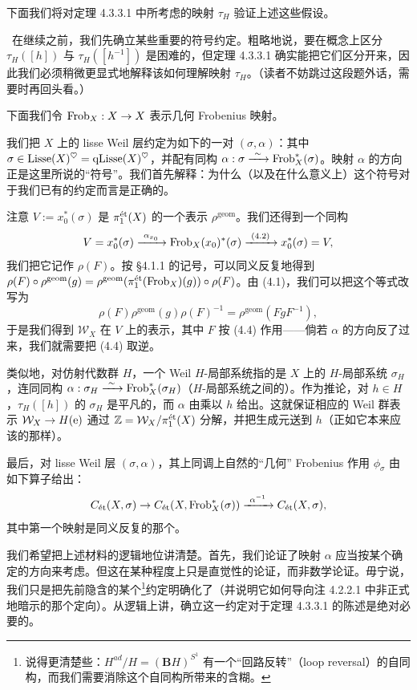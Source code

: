 下面我们将对定理 4.3.3.1 中所考虑的映射 $\tau_H$ 验证上述这些假设。

\ 在继续之前，我们先确立某些重要的符号约定。粗略地说，要在概念上区分 $\tau_H([h])$ 与 $\tau_H([h^{-1}])$ 是困难的，但定理 4.3.3.1 确实能把它们区分开来，因此我们必须稍微更显式地解释该如何理解映射 $\tau_H$。（读者不妨跳过这段题外话，需要时再回头看。）

下面我们令 $\Frob_X : X \to X$ 表示几何 Frobenius 映射。

我们把 $X$ 上的 lisse Weil 层约定为如下的一对 $(\sigma,\alpha)$：其中 $\sigma \in \mathrm{Lisse}(X)^\heartsuit = \qLisse(X)^\heartsuit$，并配有同构 $\alpha : \sigma \xrightarrow{\ \sim\ } \Frob_X^*(\sigma)$。映射 $\alpha$ 的方向正是这里所说的“符号”。我们首先解释：为什么（以及在什么意义上）这个符号对于我们已有的约定而言是正确的。

注意 $V := x_0^*(\sigma)$ 是 $\pi_1^{\et}(X)$ 的一个表示 $\rho^{\mathrm{geom}}$。我们还得到一个同构
\begin{equation}
  V = x_0^*(\sigma) \xrightarrow{\ \alpha_{x_0}\ } \Frob_X(x_0)^*(\sigma) \xrightarrow{\ (4.2)\ } x_0^*(\sigma) = V,
\end{equation}
我们把它记作 $\rho(F)$。按 §4.1.1 的记号，可以同义反复地得到 $\rho(F) \circ \rho^{\mathrm{geom}}(g) = \rho^{\mathrm{geom}}(\pi_1^{\et}(\Frob_X)(g)) \circ \rho(F)$。由 (4.1)，我们可以把这个等式改写为
\[
  \rho(F)\rho^{\mathrm{geom}}(g)\rho(F)^{-1} = \rho^{\mathrm{geom}}(FgF^{-1}),
\]
于是我们得到 $\mathcal{W}_X$ 在 $V$ 上的表示，其中 $F$ 按 (4.4) 作用——倘若 $\alpha$ 的方向反了过来，我们就需要把 (4.4) 取逆。

类似地，对仿射代数群 $H$，一个 Weil $H$-局部系统指的是 $X$ 上的 $H$-局部系统 $\sigma_H$，连同同构 $\alpha : \sigma_H \xrightarrow{\ \sim\ } \Frob_X^*(\sigma_H)$（$H$-局部系统之间的）。作为推论，对 $h \in H$，$\tau_H([h])$ 的 $\sigma_H$ 是平凡的，而 $\alpha$ 由乘以 $h$ 给出。这就保证相应的 Weil 群表示 $\mathcal{W}_X \to H(\e)$ 通过 $\ZZ = \mathcal{W}_X/\pi_1^{\et}(X)$ 分解，并把生成元送到 $h$（正如它本来应该的那样）。

最后，对 lisse Weil 层 $(\sigma,\alpha)$，其上同调上自然的“几何” Frobenius 作用 $\phi_\sigma$ 由如下算子给出：
\begin{equation}
  C_{\et}(X,\sigma) \to C_{\et}(X,\Frob_X^*(\sigma)) \xrightarrow{\ \alpha^{-1}\ } C_{\et}(X,\sigma),
\end{equation}
其中第一个映射是同义反复的那个。

\begin{remark}
我们希望把上述材料的逻辑地位讲清楚。首先，我们论证了映射 $\alpha$ 应当按某个确定的方向来考虑。但这在某种程度上只是直觉性的论证，而非数学论证。毋宁说，我们只是把先前隐含的某个\footnote{说得更清楚些：$H^{ad}/H = (\mathbf{B}H)^{S^1}$ 有一个“回路反转”（loop reversal）的自同构，而我们需要消除这个自同构所带来的含糊。}约定明确化了（并说明它如何导向注 4.2.2.1 中非正式地暗示的那个定向）。从逻辑上讲，确立这一约定对于定理 4.3.3.1 的陈述是绝对必要的。
\end{remark}

